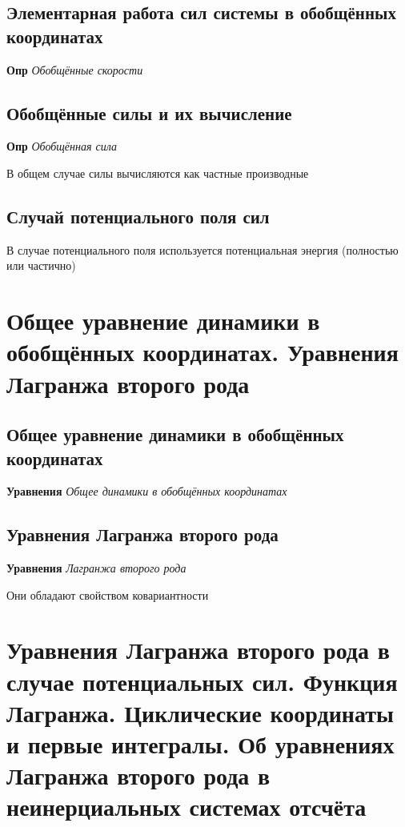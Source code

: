 \documentclass[a4paper, 14pt]{article}
\begin{document}
    \subsection{Элементарная работа сил системы в обобщённых координатах}
    
    \textbf{Опр} \textit{Обобщённые скорости}
    
    \subsection{Обобщённые силы и их вычисление}
    
    \textbf{Опр} \textit{Обобщённая сила}
    
    В общем случае силы вычисляются как частные производные
    
    \subsection{Случай потенциального поля сил}
    
    В случае потенциального поля используется потенциальная энергия (полностью или частично)
    
    \section{Общее уравнение динамики в обобщённых координатах.
    Уравнения Лагранжа второго рода}
    
    \subsection{Общее уравнение динамики в обобщённых координатах}
    
    \textbf{Уравнения} \textit{Общее динамики в обобщённых координатах}
    
    \subsection{Уравнения Лагранжа второго рода}
    
    \textbf{Уравнения} \textit{Лагранжа второго рода}
    
    Они обладают свойством ковариантности
    
    \section{Уравнения Лагранжа второго рода в случае потенциальных сил.
    Функция Лагранжа.
    Циклические координаты и первые интегралы.
    Об уравнениях Лагранжа второго рода в неинерциальных системах отсчёта}
    
\end{document}
